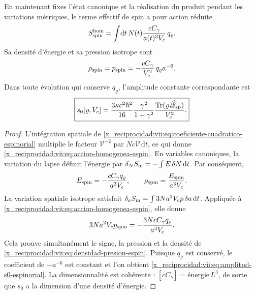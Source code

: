 \begin{theorem}
\label{x_reciprocidad:vii:thm:amplitud-material-explicita}
En maintenant fixes l'état canonique et la réalisation du produit
pendant les variations métriques, le terme effectif de spin a pour
action réduite
\begin{equation}
 S_{\rm spin}^{\rm hom}
 =\int\!\mathrm dt\,N(t)
       \frac{cC_\gamma}{a(t)^3V_c}\,q_\varrho.
 \label{x_reciprocidad:vii:eq:accion-homogenea-espin}
\end{equation}
Sa densité d'énergie et sa pression isotrope sont
\begin{equation}
 \rho_{\rm spin}=p_{\rm spin}
 =-\frac{cC_\gamma}{V_c^2}\,q_\varrho a^{-6}.
 \label{x_reciprocidad:vii:eq:densidad-presion-espin}
\end{equation}
Dans toute évolution qui conserve \(q_\varrho\), l'amplitude constante correspondante est
\begin{equation}
 \boxed{\displaystyle
 s_0[\varrho,V_c]
 =\frac{3\kappa c^2\hbar^2}{16}
    \frac{\gamma^2}{1+\gamma^2}
    \frac{\operatorname{Tr}
       (\varrho\widehat{\mathscr Q}_{\rm sp})}{V_c^2}.}
 \label{x_reciprocidad:vii:eq:amplitud-s0-espinorial}
\end{equation}
\end{theorem}
\begin{proof}
L'intégration spatiale de
\eqref{x_reciprocidad:vii:eq:coeficiente-cuadratico-espinorial} multiplie le
facteur \(\mathcal V^{-2}\) par
\(Nc\mathcal V\,\mathrm dt\), ce qui donne
\eqref{x_reciprocidad:vii:eq:accion-homogenea-espin}. En variables canoniques,
la variation du lapse définit l'énergie par
\(\delta_N S_{\rm m}=-\int E\,\delta N\,\mathrm dt\).
Par conséquent,
\[
 E_{\rm spin}=-\frac{cC_\gamma q_\varrho}{a^3V_c},
 \qquad \rho_{\rm spin}=\frac{E_{\rm spin}}{a^3V_c}.
\]
La variation spatiale isotrope satisfait \(\delta_a S_{\rm m}=\int3Na^2V_c p\,\delta a\,\mathrm dt\). Appliquée à \eqref{x_reciprocidad:vii:eq:accion-homogenea-espin}, elle donne
\[
 3Na^2V_c p_{\rm spin}
 =-\frac{3NcC_\gamma q_\varrho}{a^4V_c}.
\]
Cela prouve simultanément le signe, la pression et la densité de \eqref{x_reciprocidad:vii:eq:densidad-presion-espin}. Puisque \(q_\varrho\) est conservé, le coefficient de \(-a^{-6}\) est constant et l'on obtient \eqref{x_reciprocidad:vii:eq:amplitud-s0-espinorial}. La dimensionnalité est cohérente : \([cC_\gamma]=\text{énergie}\,L^3\), de sorte que \(s_0\) a la dimension d'une densité d'énergie.
\end{proof}

